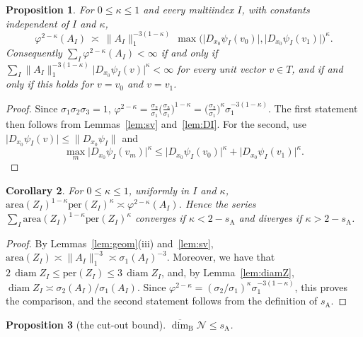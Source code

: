 \documentclass[11pt]{amsart}
\newtheorem{proposition}{Proposition}[section]
\newtheorem{corollary}[proposition]{Corollary}
\theoremstyle{definition}
\theoremstyle{remark}
\newcommand{\cN}{\mathcal N}
\newcommand{\udimB}{\overline{\dim}_{\mathrm B}}
\newcommand{\sA}{s_{\mathrm A}}
\newcommand{\abs}[1]{\lvert #1\rvert}
\newcommand{\norm}[1]{\lVert #1\rVert}
\DeclareMathOperator{\diam}{diam}
\begin{document}
\begin{proposition}\label{prop:phiD}
For $0\le\kappa\le1$ and every multiindex $I$, with constants independent of $I$ and $\kappa$,
\[
  \varphi^{2-\kappa}(A_I)\ \asymp\ \norm{A_I}_1^{-3(1-\kappa)}\,
  \max\bigl(\abs{D_{x_0}\psi_I(v_0)},\abs{D_{x_0}\psi_I(v_1)}\bigr)^{\kappa} .
\]
Consequently $\sum_I\varphi^{2-\kappa}(A_I)<\infty$ if and only if
$\sum_I\norm{A_I}_1^{-3(1-\kappa)}\abs{D_{x_0}\psi_I(v)}^\kappa<\infty$ for every unit vector $v\in T$,
and if and only if this holds for $v=v_0$ and $v=v_1$.
\end{proposition}

\begin{proof}
Since $\sigma_1\sigma_2\sigma_3=1$,
$\varphi^{2-\kappa}=\frac{\sigma_2}{\sigma_1}\bigl(\frac{\sigma_3}{\sigma_1}\bigr)^{1-\kappa}
=\bigl(\frac{\sigma_2}{\sigma_1}\bigr)^\kappa\sigma_1^{-3(1-\kappa)}$. The first statement
then follows from Lemmas~\ref{lem:sv} and~\ref{lem:DI}. For the second, use
$\abs{D_{x_0}\psi_I(v)}\le\norm{D_{x_0}\psi_I}$ and 
\[
\max_m\abs{D_{x_0}\psi_I(v_m)}^\kappa\le\abs{D_{x_0}\psi_I(v_0)}^\kappa+\abs{D_{x_0}\psi_I(v_1)}^\kappa.
\]
\end{proof}

\begin{corollary}\label{cor:cutoutA}
For $0\le\kappa\le1$, uniformly in $I$ and $\kappa$,
$\mathrm{area}(Z_I)^{1-\kappa}\mathrm{per}(Z_I)^\kappa\asymp\varphi^{2-\kappa}(A_I)$.
Hence the series $\sum_I\mathrm{area}(Z_I)^{1-\kappa}\mathrm{per}(Z_I)^\kappa$
converges if $\kappa<2-\sA$ and diverges if $\kappa>2-\sA$.
\end{corollary}

\begin{proof}
    By Lemmas~\ref{lem:geom}(iii) and~\ref{lem:sv}, $\mathrm{area}(Z_I)\asymp\norm{A_I}_1^{-3}\asymp\sigma_1(A_I)^{-3}$. 
    Moreover, we have that $2\,\diam Z_I\le\mathrm{per}(Z_I)\le3\,\diam Z_I$, and, by Lemma~\ref{lem:diamZ}, $\diam Z_I\asymp\sigma_2(A_I)/\sigma_1(A_I)$. 
    Since $\varphi^{2-\kappa}=(\sigma_2/\sigma_1)^\kappa\sigma_1^{-3(1-\kappa)}$, this proves the comparison, and the second statement follows from the definition of $\sA$.
\end{proof}

\begin{proposition}[the cut-out bound]\label{prop:cutout}
$\udimB\cN\le\sA$.
\end{proposition}
\end{document}
